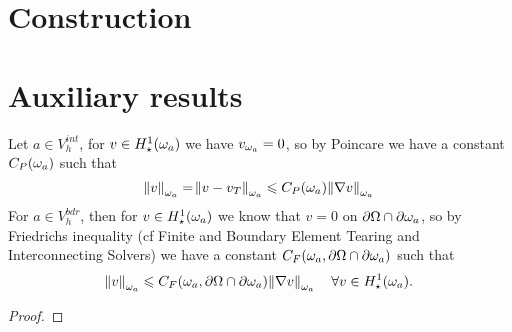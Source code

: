 \documentclass[thesis.tex]{subfiles}
\begin{document}
\section{Construction}




\section{Auxiliary results}
\label{sec:aux}
Let $a \in V_h^{int}$, for $v \in H_\star^1(\omega_a)$ we have $v_{\omega_a} = 0$, so by Poincare we have a constant $C_P(\omega_a)$ such that 
\[
  \norm{v}_{\omega_a} = \norm{v - v_T}_{\omega_a} \leqslant C_P(\omega_a) \norm{\nabla v}_{\omega_a}
\]
For $a \in V_h^{bdr}$, then for $v \in H_\star^1(\omega_a)$ we know that $v = 0$ on $\partial \Omega \cap \partial \omega_a$, so by Friedrichs inequality
(cf Finite and Boundary Element Tearing and Interconnecting Solvers) we
have a constant $C_F(\omega_a, \partial \Omega \cap \partial \omega_a)$ such that
\[
  \norm{v}_{\omega_a} \leqslant C_F(\omega_a, \partial \Omega \cap \partial \omega_a) \norm{\nabla v}_{\omega_a} \quad \forall v \in H_\star^1(\omega_a).
\]

\begin{proof}
\end{proof}
\end{document}

